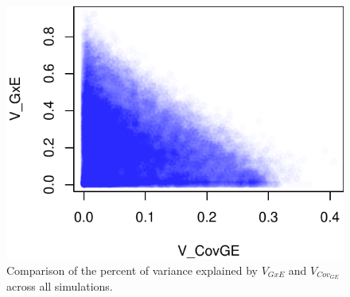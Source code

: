 \documentclass[11pt, oneside]{amsart}
\begin{document}
\renewcommand\thefigure{S5}
\begin{figure}[h]
\begin{center}
\includegraphics[width=6in]{Figs/VgxevsVcov.pdf}
\end{center}
\label{Fig: }
\caption[Comparison of the percent of variance explained by $V_{GxE}$ and $V_{Cov_{GE}}$ across all simulations.]{Comparison of the percent of variance explained by $V_{GxE}$ and $V_{Cov_{GE}}$ across all simulations.  }
\end{figure}

\clearpage
\newpage
\end{document}
